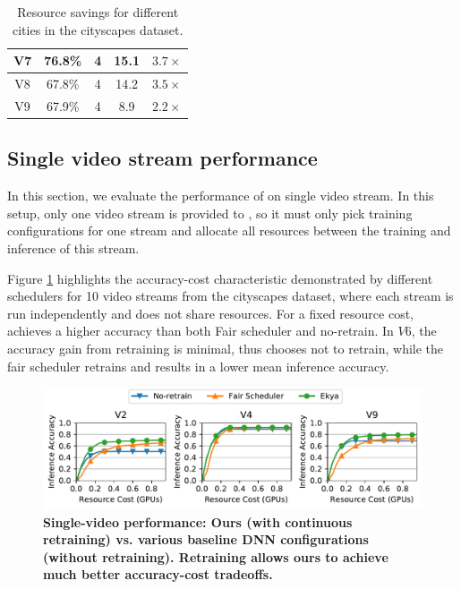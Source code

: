 \begin{table}[]
\begin{tabular}{|c|c|c|c|c|}
V7                                                                      & 76.8\%                    & 4           & 15.1                 & $3.7\times$                                                                 \\ \hline
V8                                                                      & 67.8\%                    & 4           & 14.2                 & $3.5\times$                                                                 \\ \hline
V9                                                                      & 67.9\%                    & 4           & 8.9                  & $2.2\times$                                                                 \\ \hline
\end{tabular}
\label{tab:resource-savings}
\caption{Resource savings for different cities in the cityscapes dataset.}
\end{table}

\subsection{Single video stream performance}
In this section, we evaluate the performance of \name{} on single video stream. In this setup, only one video stream is provided to \name{}, so it must only pick training configurations for one stream and allocate all resources between the training and inference of this stream. 

Figure \ref{fig:single-tradeoffs} highlights the accuracy-cost characteristic demonstrated by different schedulers for 10 video streams from the cityscapes dataset, where each stream is run independently and does not share resources. For a fixed resource cost, \name{} achieves a higher accuracy than both Fair scheduler and no-retrain.  In $V6$, the accuracy gain from retraining is minimal, thus \name{} chooses not to retrain, while the fair scheduler retrains and results in a lower mean inference accuracy.

\begin{figure}
 	\includegraphics[width=\linewidth]{results/singlecam/singlecam_acc_vs_cost_cityscapes.pdf}
	\caption{\bf Single-video performance: Ours (with continuous retraining) vs. various baseline DNN configurations (without retraining). Retraining allows ours to achieve much better accuracy-cost tradeoffs.}
	\label{fig:single-tradeoffs}
\end{figure}


